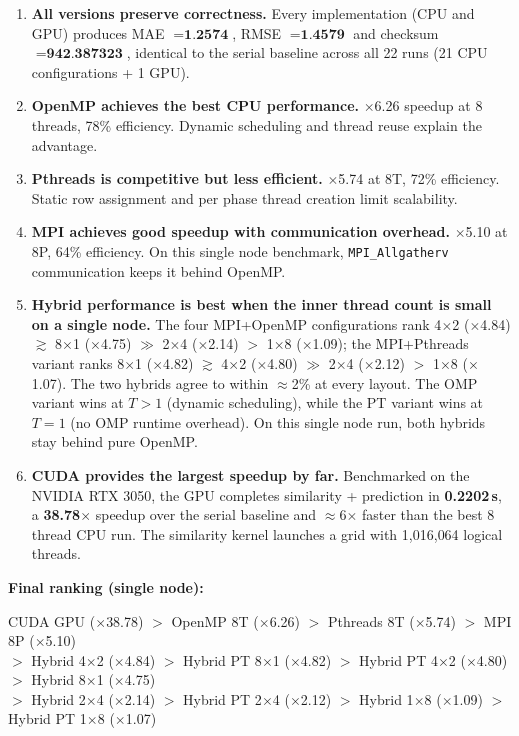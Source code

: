 \documentclass[11pt,a4paper]{article}
\newcommand{\code}[1]{\texttt{\small #1}}
\begin{document}
\begin{enumerate}
  \item \textbf{All versions preserve correctness.} Every implementation (CPU and
        GPU) produces MAE $=\textbf{1.2574}$, RMSE $=\textbf{1.4579}$ and checksum
        $=\textbf{942.387323}$, identical to the serial baseline across all
        22 runs (21 CPU configurations + 1 GPU).
  \item \textbf{OpenMP achieves the best CPU performance.} $\times$6.26 speedup at
        8 threads, 78\% efficiency. Dynamic scheduling and thread reuse explain
        the advantage.
  \item \textbf{Pthreads is competitive but less efficient.} $\times$5.74 at 8T,
        72\% efficiency. Static row assignment and per phase thread creation
        limit scalability.
  \item \textbf{MPI achieves good speedup with communication overhead.}
        $\times$5.10 at 8P, 64\% efficiency. On this single node benchmark,
        \code{MPI\_Allgatherv} communication keeps it behind OpenMP.
  \item \textbf{Hybrid performance is best when the inner thread count is small
        on a single node.} The four MPI+OpenMP configurations rank
        4$\times$2 ($\times$4.84) $\gtrsim$ 8$\times$1 ($\times$4.75)
        $\gg$ 2$\times$4 ($\times$2.14) $>$ 1$\times$8 ($\times$1.09); the
        MPI+Pthreads variant ranks 8$\times$1 ($\times$4.82) $\gtrsim$
        4$\times$2 ($\times$4.80) $\gg$ 2$\times$4 ($\times$2.12) $>$
        1$\times$8 ($\times$1.07). The two hybrids agree to within $\approx$2\%
        at every layout. The OMP variant wins at $T>1$ (dynamic scheduling),
        while the PT variant wins at $T=1$ (no OMP runtime overhead). On this
        single node run, both hybrids stay behind pure OpenMP.
  \item \textbf{CUDA provides the largest speedup by far.} Benchmarked on the
        NVIDIA RTX 3050, the GPU completes similarity + prediction in
        \textbf{0.2202\,s}, a \textbf{38.78$\times$} speedup over the serial
        baseline and $\approx$6$\times$ faster than the best 8 thread CPU run.
        The similarity kernel launches a grid with 1{,}016{,}064 logical
        threads.
\end{enumerate}

\textbf{Final ranking (single node):}
\begin{center}
CUDA GPU ($\times$38.78)
$>$ OpenMP 8T ($\times$6.26)
$>$ Pthreads 8T ($\times$5.74)
$>$ MPI 8P ($\times$5.10) \\[2pt]
$>$ Hybrid 4$\times$2 ($\times$4.84)
$>$ Hybrid PT 8$\times$1 ($\times$4.82)
$>$ Hybrid PT 4$\times$2 ($\times$4.80)
$>$ Hybrid 8$\times$1 ($\times$4.75) \\[2pt]
$>$ Hybrid 2$\times$4 ($\times$2.14)
$>$ Hybrid PT 2$\times$4 ($\times$2.12)
$>$ Hybrid 1$\times$8 ($\times$1.09)
$>$ Hybrid PT 1$\times$8 ($\times$1.07)
\end{center}
\end{document}
